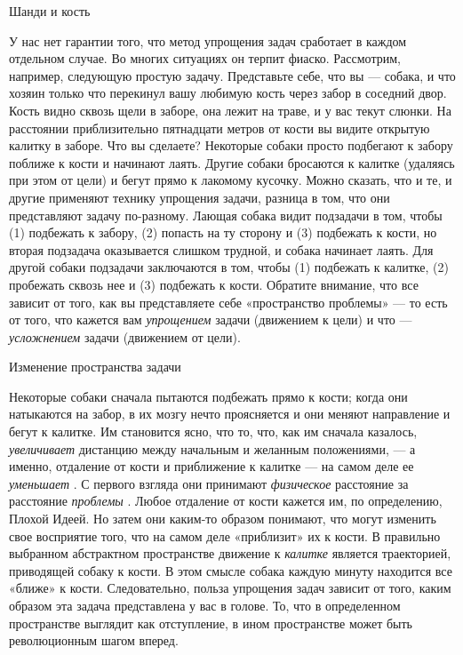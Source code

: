 Шанди и кость

У нас нет гарантии того, что метод упрощения задач сработает в каждом отдельном случае. Во многих ситуациях он терпит фиаско. Рассмотрим, например, следующую простую задачу. Представьте себе, что вы --- собака, и что хозяин только что перекинул вашу любимую кость через забор в соседний двор. Кость видно сквозь щели в заборе, она лежит на траве, и у вас текут слюнки. На расстоянии приблизительно пятнадцати метров от кости вы видите открытую калитку в заборе. Что вы сделаете? Некоторые собаки просто подбегают к забору поближе к кости и начинают лаять. Другие собаки бросаются к калитке (удаляясь при этом от цели) и бегут прямо к лакомому кусочку. Можно сказать, что и те, и другие применяют технику упрощения задачи, разница в том, что они представляют задачу по-разному. Лающая собака видит подзадачи в том, чтобы (1) подбежать к забору, (2) попасть на ту сторону и (3) подбежать к кости, но вторая подзадача оказывается слишком трудной, и собака начинает лаять. Для другой собаки подзадачи заключаются в том, чтобы (1) подбежать к калитке, (2) пробежать сквозь нее и (3) подбежать к кости. Обратите внимание, что все зависит от того, как вы представляете себе «пространство проблемы» --- то есть от того, что кажется вам \emph{упрощением} задачи (движением к цели) и что --- \emph{усложнением} задачи (движением от цели).

Изменение пространства задачи

Некоторые собаки сначала пытаются подбежать прямо к кости; когда они натыкаются на забор, в их мозгу нечто проясняется и они меняют направление и бегут к калитке. Им становится ясно, что то, что, как им сначала казалось, \emph{увеличивает} дистанцию между начальным и желанным положениями, --- а именно, отдаление от кости и приближение к калитке --- на самом деле ее \emph{уменьшает} . С первого взгляда они принимают \emph{физическое} расстояние за расстояние \emph{проблемы} . Любое отдаление от кости кажется им, по определению, Плохой Идеей. Но затем они каким-то образом понимают, что могут изменить свое восприятие того, что на самом деле «приблизит» их к кости. В правильно выбранном абстрактном пространстве движение к \emph{калитке} является траекторией, приводящей собаку к кости. В этом смысле собака каждую минуту находится все «ближе» к кости. Следовательно, польза упрощения задач зависит от того, каким образом эта задача представлена у вас в голове. То, что в определенном пространстве выглядит как отступление, в ином пространстве может быть революционным шагом вперед.


